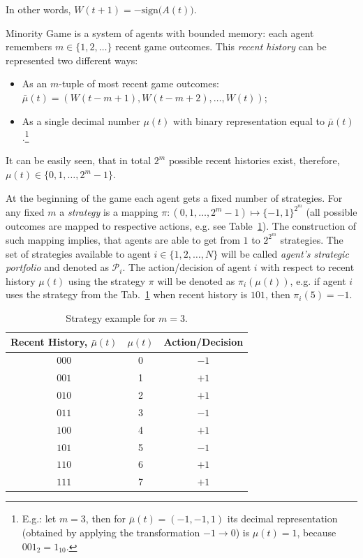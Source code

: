 \documentclass[12pt,american,czech]{article}
\begin{document}
\noindent
In other words, $W(t+1) = -\text{sign}\big(A(t)\big)$.

\medskip

Minority  Game is a system of agents with bounded memory: each agent remembers $m\in\{1,2,\dots\}$ recent game outcomes. This \textit{recent history} can be represented two different ways:

\begin{itemize}
	\item As an $m$-tuple of most recent game outcomes: $\bar{\mu}(t)=(W(t-m+1),W(t-m+2),\dots,W(t))$;
	\item As a single decimal number $\mu(t)$ with binary representation equal to $\bar{\mu}(t)$.\footnote{E.g.: let $m=3$, then for $\bar{\mu}(t)=(-1,-1,1)$ its decimal representation (obtained by applying the transformation $-1\rightarrow 0$) is $\mu(t)=1$, because $001_{2}=1_{10}$.}
\end{itemize} 

\noindent
It can be easily seen, that in total $2^{m}$ possible recent histories exist, therefore, $\mu(t)\in\{0,1,\dots,2^{m}-1\}$.

\medskip

At the beginning of the game each agent gets a fixed number of strategies. For any fixed $m$ a \textit{strategy} is a mapping $\pi:(0,1,\dots,2^m-1)\mapsto\{-1,1\}^{2^{m}}$ (all possible outcomes are mapped to respective actions, e.g. see Table~\ref{tab:strategy_table_example}). The construction of such mapping implies, that agents are able to get from $1$ to $2^{2^{m}}$ strategies. The set of strategies available to agent $i\in\{1,2,\dots,N\}$ will be called \textit{agent's strategic portfolio} and denoted as $\mathcal{P}_{i}$. The action/decision of agent $i$ with respect to recent history $\mu(t)$ using the strategy $\pi$ will be denoted as $\pi_{i}(\mu(t))$, e.g. if agent $i$ uses the strategy from the Tab.~\ref{tab:strategy_table_example} when recent history is $101$, then $\pi_{i}(5)= -1$.

\begin{table}
	\centering
	\begin{tabular}{|c|c||c|}
		\hline
		Recent History, $\bar{\mu}(t)$ & $\mu(t)$ & Action/Decision \\
		\hline
		\hline 
		$0 0 0$ & 0 & $-1$ \\ 
		$0 0 1$ & 1 & $+1$ \\ 
		$0 1 0$ & 2 & $+1$ \\ 
		$0 1 1$ & 3 & $-1$ \\ 
		$1 0 0$ & 4 & $+1$ \\ 
		$1 0 1$ & 5 & $-1$ \\ 
		$1 1 0$ & 6 & $+1$ \\ 
		$1 1 1$ & 7 & $+1$ \\
		\hline
	\end{tabular} 
	\caption{Strategy example for $m=3$.} 
	\label{tab:strategy_table_example}
\end{table}
\end{document}
